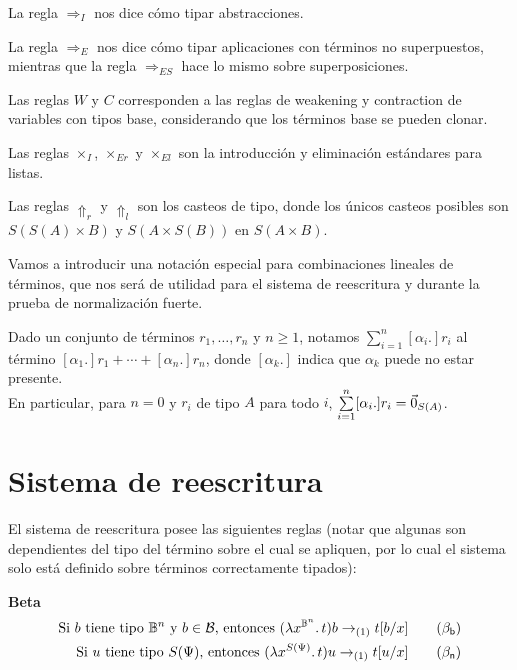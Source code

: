 La regla \( \Rightarrow_I \) nos dice cómo tipar abstracciones.

La regla \( \Rightarrow_E \) nos dice cómo tipar aplicaciones con términos no superpuestos, mientras que la regla \( \Rightarrow_{ES} \) hace lo mismo sobre superposiciones.

Las reglas \( W \) y \( C \) corresponden a las reglas de weakening y contraction de variables con tipos base, considerando que los términos base se pueden clonar.

Las reglas \( \times_I \), \( \times_{Er} \) y \( \times_{El} \) son la introducción y eliminación estándares para listas.

Las reglas \( \Uparrow_r \) y \( \Uparrow_l \) son los casteos de tipo, donde los únicos casteos posibles son \( S(S(A) \times B) \) y \( S(A \times S(B)) \) en \( S(A \times B) \).

Vamos a introducir una notación especial para combinaciones lineales de términos, que nos será de utilidad para el sistema de reescritura y durante la prueba de normalización fuerte.

\begin{definition}
	Dado un conjunto de términos \( r_1, \ldots, r_n \) y \( n \geq 1 \), notamos \( \sum\limits_{i = 1}^n [\alpha_i .] r_i \) al término \( [\alpha_1 .] r_1 + \cdots + [\alpha_n .] r_n \), donde \( [\alpha_k .] \) indica que \( \alpha_k \) puede no estar presente. \\
	En particular, para \( n = 0 \) y \( r_i \) de tipo \( A \) para todo \( i \), \( \sum\limits_{i = 1}^n [\alpha_i .] r_i = \vec{0}_{S (A)} \).
\end{definition}

\section{Sistema de reescritura}
El sistema de reescritura posee las siguientes reglas (notar que algunas son dependientes del tipo del término sobre el cual se apliquen, por lo cual el sistema solo está definido sobre términos correctamente tipados):

\textbf{Beta}
\begin{align*}
	\text{Si } b \text{ tiene tipo } \qubittype^n\text{ y } b \in \mathcal{B} \text{, entonces } \app{(\abstr{\vrbl{x}{\qubittype^n}}{t})}{b} \reducesto_{(1)} t[b/x] \tag{\( \beta_\mathsf{b} \)} \\
	\text{Si } u \text{ tiene tipo } S(\Psi) \text{, entonces }
	\app{(\abstr{\vrbl{x}{S(\Psi)}}{t})}{u} \reducesto_{(1)} t[u/x] \tag{\( \beta_\mathsf{n} \)}
\end{align*}

